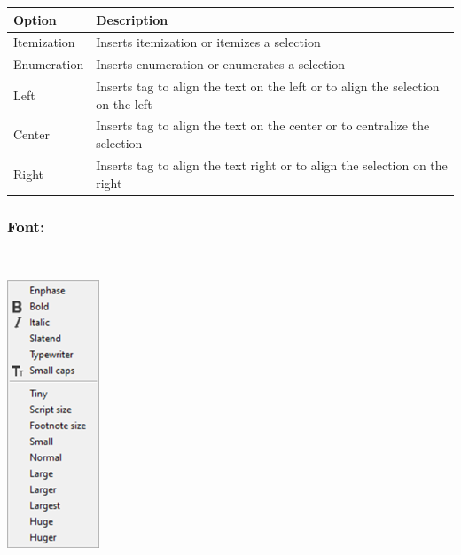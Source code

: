 \begin{scriptsize}
  \begin{tabularx}{\textwidth}{>{\hsize=0.2\hsize}X>{\hsize=0.8\hsize}X}\\
    \hline
    \textbf{Option} & \textbf{Description} \\
    \hline
    Itemization & Inserts itemization or itemizes a selection \\
    Enumeration & Inserts enumeration or enumerates a selection \\
    \hdashline[1pt/1pt]
    Left & Inserts tag to align the text on the left or to align the selection on the left \\
    Center & Inserts tag to align the text on the center or to centralize the selection \\
    Right & Inserts tag to align the text right or to align the selection on the right \\
    \hline
  \end{tabularx}
\end{scriptsize}


\newpage
\hypertarget{menu_insert_latex_font}{}
\subsubsection{Font:}\\

\includegraphics[scale=0.8]{./res/menu_insert_latex_font.png}\\

